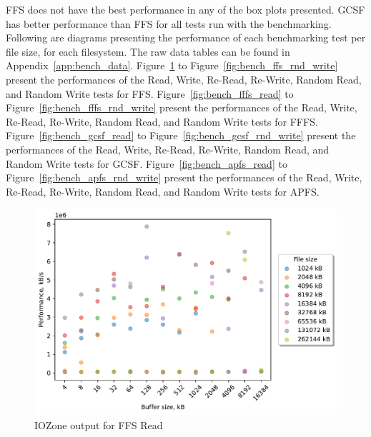 \FloatBarrier

\gls{FFS} does not have the best performance in any of the box plots presented. \gls{GCSF} has better performance than \gls{FFS} for all tests run with the benchmarking. Following are diagrams presenting the performance of each benchmarking test per file size, for each filesystem. The raw data tables can be found in Appendix~\ref{app:bench_data}. Figure~\ref{fig:bench_ffs_read} to Figure~\ref{fig:bench_ffs_rnd_write} present the performances of the Read, Write, \mbox{Re-Read}, \mbox{Re-Write}, Random Read, and Random Write tests for \gls{FFS}. Figure~\ref{fig:bench_fffs_read} to Figure~\ref{fig:bench_fffs_rnd_write} present the performances of the Read, Write, \mbox{Re-Read}, \mbox{Re-Write}, Random Read, and Random Write tests for \gls{FFFS}.  Figure~\ref{fig:bench_gcsf_read} to Figure~\ref{fig:bench_gcsf_rnd_write} present the performances of the Read, Write, \mbox{Re-Read}, \mbox{Re-Write}, Random Read, and Random Write tests for \gls{GCSF}. Figure~\ref{fig:bench_apfs_read} to Figure~\ref{fig:bench_apfs_rnd_write} present the performances of the Read, Write, \mbox{Re-Read}, \mbox{Re-Write}, Random Read, and Random Write tests for \gls{APFS}.

\begin{figure}[!htb]
	\label{fig:bench_ffs_read}
	\begin{center}
		\includegraphics[width=1.0\textwidth]{figures/benchmarking/ffs/Read.pdf}
	\end{center}
	\caption{IOZone output for FFS Read}
\end{figure}

